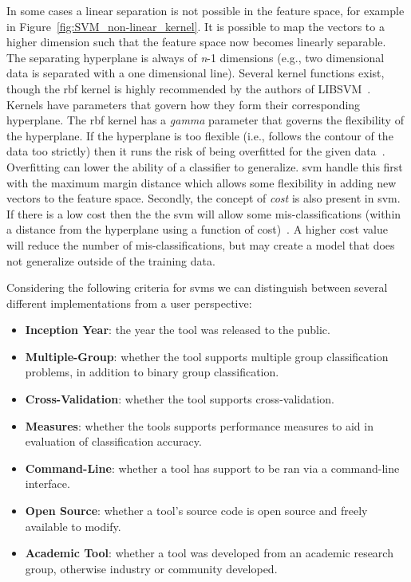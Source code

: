 In some cases a linear separation is not possible in the feature space, for example in Figure~\ref{fig:SVM_non-linear_kernel}. It is possible to map the vectors to a higher dimension such that the feature space now becomes linearly separable. The separating hyperplane is always of \emph{n}-1 dimensions (e.g., two dimensional data is separated with a one dimensional line). Several kernel functions exist, though the \gls{rbf} kernel is highly recommended by the authors of LIBSVM~\cite{HCL03}. Kernels have parameters that govern how they form their corresponding hyperplane. The \gls{rbf} kernel has a \emph{gamma} parameter that governs the flexibility of the hyperplane. If the hyperplane is too flexible (i.e., follows the contour of the data too strictly) then it runs the risk of being overfitted for the given data~\cite{BW10}. Overfitting can lower the ability of a classifier to generalize. \gls{svm} handle this first with the maximum margin distance which allows some flexibility in adding new vectors to the feature space. Secondly, the concept of \emph{cost} is also present in \gls{svm}. If there is a low cost then the the \gls{svm} will allow some mis-classifications (within a distance from the hyperplane using a function of cost)~\cite{BW10}. A higher cost value will reduce the number of mis-classifications, but may create a model that does not generalize outside of the training data.

Considering the following criteria for \gls{svm}s we can distinguish between several different implementations from a user perspective:

\begin{itemize}
  \item \textbf{Inception Year}: the year the tool was released to the public.
  \item \textbf{Multiple-Group}: whether the tool supports multiple group classification problems, in addition to binary group classification.
  \item \textbf{Cross-Validation}: whether the tool supports cross-validation.
  \item \textbf{Measures}: whether the tools supports performance measures to aid in evaluation of classification accuracy.
  \item \textbf{Command-Line}: whether a tool has support to be ran via a command-line interface.
  \item \textbf{Open Source}: whether a tool's source code is open source and freely available to modify.
  \item \textbf{Academic Tool}: whether a tool was developed from an academic research group, otherwise industry or community developed.
\end{itemize}

